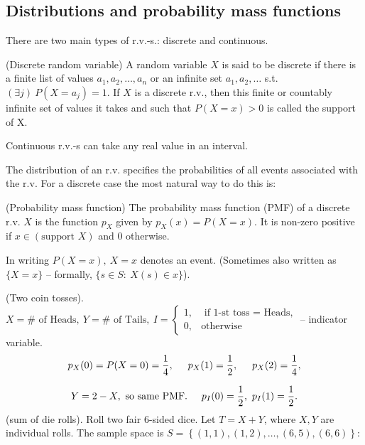 \subsection*{Distributions and probability mass functions}

There are two main types of r.v.-s.: discrete and continuous.

\begin{definition}{(Discrete random variable)}{}
    A random variable $X$ is said to be discrete if there is a finite list of values $a_1, a_2, \ldots, a_n$ or an infinite set $a_1, a_2, \ldots$ s.t. $(\exists j)\ P(X = a_j) = 1$. If $X$ is a discrete r.v., then this finite or countably infinite set of values it takes and such that $P(X = x) > 0$ is called the support of X.
\end{definition}
\begin{note}{}{}
    Continuous r.v.-s can take any real value in an interval.
\end{note}
The distribution of an r.v. specifies the probabilities of all events associated with the r.v. For a discrete case the most natural way to do this is:
\begin{definition}{(Probability mass function)}{}
    The probability mass function (PMF) of a discrete r.v. $X$ is the function $p_X$ given by $p_X(x) = P(X=x)$. It is non-zero positive if $x \in (\text{support } X)$ and 0 otherwise.
\end{definition}
\begin{note}{}{}
    In writing $P(X = x), \ X=x$ denotes an event. (Sometimes also written as $\{X = x\}$ -- formally, $\{s \in S: \ X(s) \in x\}$).
\end{note}
\example (Two coin tosses). $X = \# \text{ of Heads}, \ Y = \# \text{ of Tails}, \ I = \left\{\begin{array}{ll}
    1, & \text{ if 1-st toss = Heads},\\
    0, & \text{otherwise}
\end{array}\right.$ -- indicator variable.
\[
    \begin{array}{c}
        p_X(0) = P(X=0) = \dfrac{1}{4}, \hspace*{0.5cm} p_X(1) = \dfrac{1}{2}, \hspace*{0.5cm} p_X(2) = \dfrac{1}{4},\\[0.5cm]
        Y = 2-X, \text{ so same PMF}. \hspace*{0.5cm} p_I(0) = \dfrac{1}{2}, \ p_I(1) = \dfrac{1}{2}.
    \end{array}  
\]
\example (sum of die rolls). Roll two fair $6$-sided dice. Let $T = X+Y$, where $X, Y$ are individual rolls. The sample space is $S = \left\{\left(1,1\right), \left(1,2\right), \ldots, \left(6,5\right), \left(6,6\right)\right\}$:
